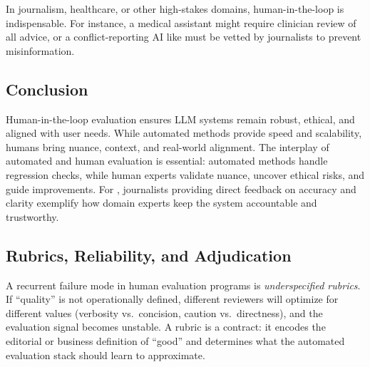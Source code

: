In journalism, healthcare, or other high-stakes domains, human-in-the-loop is indispensable. For instance, a medical assistant might require clinician review of all advice, or a conflict-reporting AI like \ishtar{} must be vetted by journalists to prevent misinformation.  

\subsection*{Conclusion}
Human-in-the-loop evaluation ensures LLM systems remain robust, ethical, and aligned with user needs. While automated methods provide speed and scalability, humans bring nuance, context, and real-world alignment. The interplay of automated and human evaluation is essential: automated methods handle regression checks, while human experts validate nuance, uncover ethical risks, and guide improvements. For \ishtar{}, journalists providing direct feedback on accuracy and clarity exemplify how domain experts keep the system accountable and trustworthy.


\subsection{Rubrics, Reliability, and Adjudication}
\label{sec:ch10-hitl-rubrics}
A recurrent failure mode in human evaluation programs is \emph{underspecified rubrics}. If ``quality'' is not operationally defined, different reviewers will optimize for different values (verbosity vs.\ concision, caution vs.\ directness), and the evaluation signal becomes unstable.
A rubric is a contract: it encodes the editorial or business definition of ``good'' and determines what the automated evaluation stack should learn to approximate.

